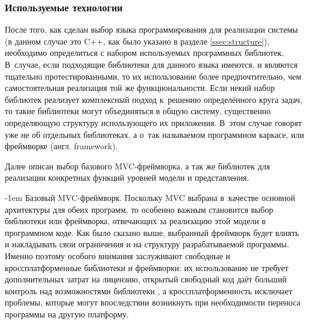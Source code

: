 \documentclass[a4paper, 14pt, titlepage]{extarticle}
\makeatletter
\newcommand{\eng}[1]{\foreignlanguage{english}{#1}}
\renewcommand{\paragraph}{%
    \@startsection{paragraph}{4}%
    {\parindent}{\z@}{-1em}%
    {\normalfont\normalsize\bfseries}%
  }
\makeatother
\begin{document}
  \subsubsection{Используемые технологии}\label{sssec:techno}

  После того, как сделан выбор языка программирования для реализации системы (в данном случае это
  C++, как было указано в разделе \ref{ssec:structure}), необходимо определиться с набором используемых
  программных библиотек. В~случае, если подходящие библиотеки для данного языка имеются, и являются тщательно
  протестированными, то их использование более предпочтительно, чем самостоятельная реализация той
  же функциональности. Если некий набор библиотек реализует комплексный подход к~решению
  определённого круга задач, то такие библиотеки могут объединяться в общую систему, существенно
  определяющую структуру использующего их приложения. В~этом случае говорят уже не об отдельных
  библиотеках, а о~так называемом программном каркасе, или фреймворке (англ. \eng{framework}).

  Далее описан выбор базового MVC-фреймворка, а так же библиотек для реализации
  конкретных функций уровней модели и представления.

  \paragraph{Базовый MVC-фреймворк.}
  Поскольку MVC выбрана в~качестве основной архитектуры для обеих программ, то особенно важным
  становится выбор библиотеки или фреймворка, отвечающих за реализацию этой модели в программном
  коде. Как было сказано выше, выбранный фреймворк будет влиять и накладывать свои ограничения и на
  структуру разрабатываемой программы. Именно поэтому особого внимания заслуживают свободные и
  кроссплатформенные библиотеки и фреймворки: их использование не требует дополнительных затрат на
  лицензию, открытый свободный код даёт больший контроль над возможностями библиотеки \cite{open-source},
  а кроссплатформенность исключает проблемы, которые могут впоследствии возникнуть при необходимости
  переноса программы на другую платформу.
\end{document}
